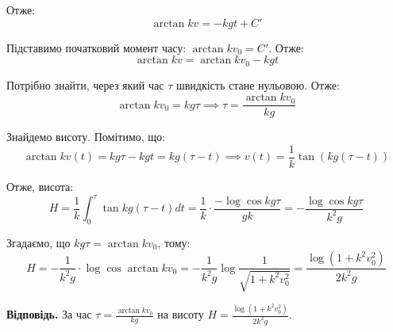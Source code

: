 \documentclass[12pt]{extarticle}
\begin{document}
Отже:
\[
\arctan kv = -kgt + C'
\]

Підставимо початковий момент часу: $\arctan kv_0 = C'$. Отже:
\[
\arctan kv = \arctan kv_0 - kgt
\]

Потрібно знайти, через який час $\tau$ швидкість стане нульовою. Отже:
\[
\arctan kv_0 = kg\tau \implies \tau = \frac{\arctan kv_0}{kg}
\]

Знайдемо висоту. Помітимо, що:
\[
\arctan kv(t) = kg\tau - kgt = kg(\tau - t) \implies v(t) = \frac{1}{k}\tan\left(kg(\tau-t)\right)
\]

Отже, висота:
\[
H = \frac{1}{k}\int_0^{\tau} \tan kg(\tau - t)dt = \frac{1}{k} \cdot \frac{-\log \cos kg\tau}{gk} = -\frac{\log \cos kg\tau}{k^2g}
\]

Згадаємо, що $kg\tau = \arctan kv_0$, тому:
\[
H = -\frac{1}{k^2 g} \cdot \log \cos \arctan kv_0 = -\frac{1}{k^2g} \log \frac{1}{\sqrt{1+k^2v_0^2}} = \frac{\log(1+k^2v_0^2)}{2k^2g}
\]

\textbf{Відповідь.} За час $\tau=\frac{\arctan kv_0}{kg}$ на висоту $H=\frac{\log(1+k^2v_0^2)}{2k^2g}$. 
\end{document}

